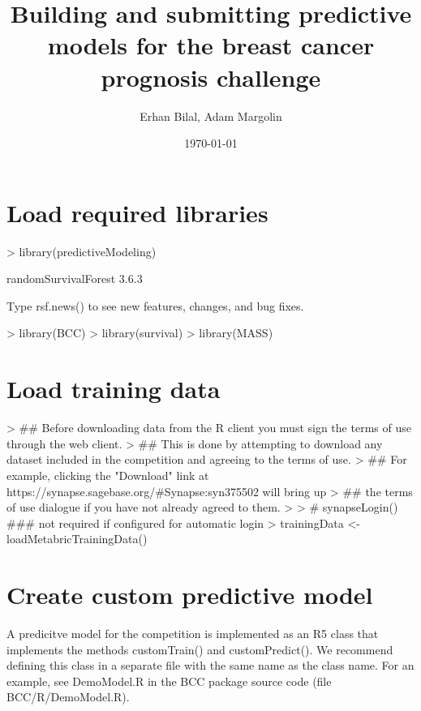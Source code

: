 \documentclass[10pt]{article}
\title{Building and submitting predictive models for the breast cancer prognosis challenge}
\author{Erhan Bilal, Adam Margolin}
\date{\today}
\begin{document}


\maketitle

\section{Load required libraries}
\begin{Schunk}
\begin{Sinput}
> library(predictiveModeling)
\end{Sinput}
\begin{Soutput}
randomSurvivalForest 3.6.3

Type rsf.news() to see new features, changes, and bug fixes.
\end{Soutput}
\begin{Sinput}
> library(BCC)
> library(survival)
> library(MASS)
\end{Sinput}
\end{Schunk}

\section{Load training data}
\begin{Schunk}
\begin{Sinput}
> ## Before downloading data from the R client you must sign the terms of use through the web client.
> ## This is done by attempting to download any dataset included in the competition and agreeing to the terms of use.
> ## For example, clicking the "Download" link at https://synapse.sagebase.org/\#Synapse:syn375502 will bring up
> ## the terms of use dialogue if you have not already agreed to them.
> 
> # synapseLogin() ### not required if configured for automatic login
> trainingData <- loadMetabricTrainingData()
\end{Sinput}
\end{Schunk}

\section{Create custom predictive model}
A predicitve model for the competition is implemented as an R5 class that implements the methods customTrain() and customPredict(). We recommend defining this class in a separate file with the same name as the class name. For an example, see DemoModel.R in the BCC package source code (file BCC/R/DemoModel.R).
\end{document}
